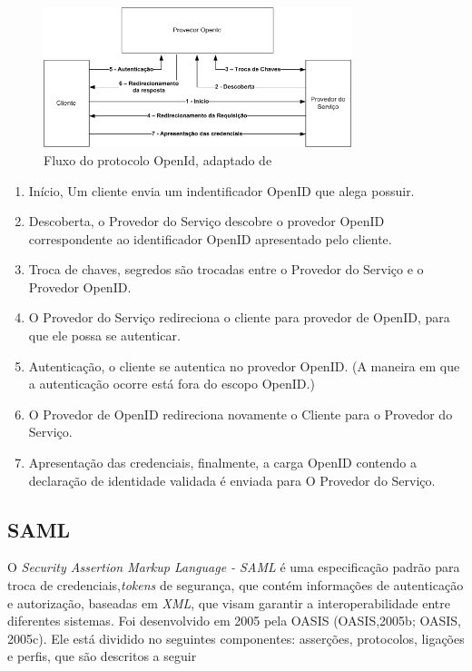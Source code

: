 \begin{figure}[!htb]
\centering
\includegraphics[width=0.8\textwidth]{openiddiagram.png}
\caption{Fluxo do protocolo OpenId, adaptado de~\cite{rfc6749}}
\label{fig:openid}
\end{figure}

\begin{enumerate}[1 )]
\item  Início, Um cliente envia um indentificador OpenID que alega possuir.

\item  Descoberta, o Provedor do Serviço descobre o provedor OpenID correspondente ao identificador OpenID apresentado pelo cliente.

\item Troca de chaves,  segredos são trocadas entre o Provedor do Serviço e o Provedor OpenID.

\item O Provedor do Serviço redireciona o cliente para provedor de OpenID, para que ele possa se autenticar.

\item Autenticação, o cliente se autentica no provedor OpenID. (A maneira em que a autenticação ocorre está fora do escopo OpenID.)

\item O Provedor de OpenID redireciona novamente o Cliente para o Provedor do Serviço.

\item Apresentação das credenciais, finalmente, a carga OpenID contendo a declaração de identidade validada é enviada para O Provedor do Serviço.

\end{enumerate}

\subsection{SAML}

O \emph{Security Assertion Markup Language - SAML} é uma especificação padrão para troca de credenciais,\emph{tokens} de segurança, que contém informações de autenticação e autorização, baseadas em \emph{XML}, que visam garantir a interoperabilidade entre diferentes sistemas. Foi desenvolvido em 2005 pela OASIS (OASIS,2005b; OASIS, 2005c). Ele está dividido no seguintes componentes: asserções, protocolos, ligações e perfis, que são descritos a seguir~\cite{Madsen2005}

